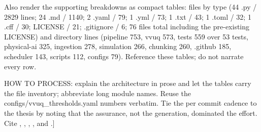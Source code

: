 Also render the supporting breakdowns as compact tables: files by type
(44 .py / 2829 lines; 24 .md / 1140; 2 .yaml / 79; 1 .yml / 73; 1 .txt /
43; 1 .toml / 32; 1 .cff / 30; LICENSE / 21; .gitignore / 6; 76 files
total including the pre-existing LICENSE) and directory lines (pipeline
753, vvuq 573, tests 559 over 53 tests, physical-ai 325, ingestion 278,
simulation 266, chunking 260, .github 185, scheduler 143, scripts 112,
configs 79). Reference these tables; do not narrate every row.

HOW TO PROCESS: explain the architecture in prose and let the tables carry
the file inventory; abbreviate long module names. Reuse the
configs/vvuq\_thresholds.yaml numbers verbatim. Tie the per commit cadence
to the thesis by noting that the assurance, not the generation, dominated
the effort. Cite \cite{repo-cancer-automated}, \cite{anthropicopus47},
\cite{anthropicclaudecodeweb}, \cite{iec62304}, and \cite{iche6r3}.]
